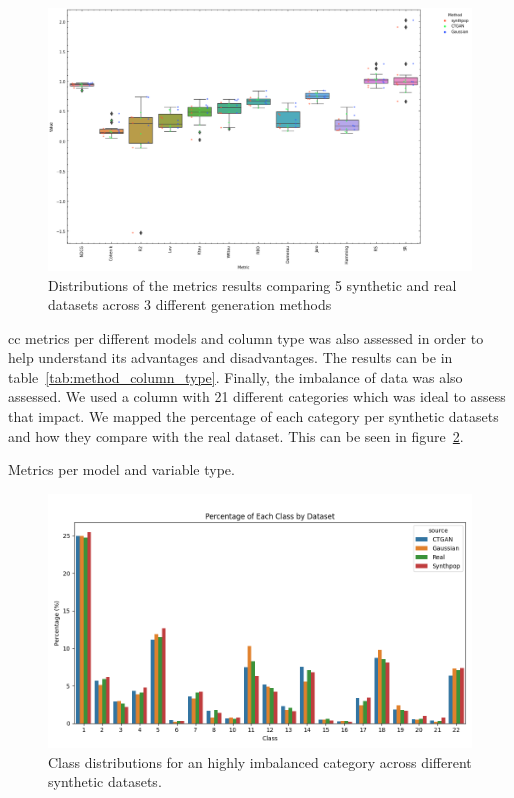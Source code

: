     
\begin{figure}[htbp]
\centering
\caption{Distributions of the metrics results comparing 5 synthetic and real datasets across 3 different generation methods}\label{fig:synth_result} 
\includegraphics[scale=0.55]{figures/synthetic_violin_swarm_colored_by_group_custom.png}
\end{figure}

\Ac{cc} metrics per different models and column type was also assessed in order to help understand its advantages and disadvantages. The results can be in table~\ref{tab:method_column_type}. Finally, the imbalance of data was also assessed. We used a column with 21 different categories which was ideal to assess that impact. We mapped the percentage of each category per synthetic datasets and how they compare with the real dataset. This can be seen in figure~\ref{fig:imbalance}.
\begin{table}[h!]
    \caption{Metrics per model and variable type.}\label{tab:method_column_type}

\end{table}


\begin{figure}[htbp]
    \centering
    \caption{Class distributions for an highly imbalanced category across different synthetic datasets.}\label{fig:imbalance} 
    \includegraphics[scale=0.55]{figures/imbalance.png}
    \end{figure}


